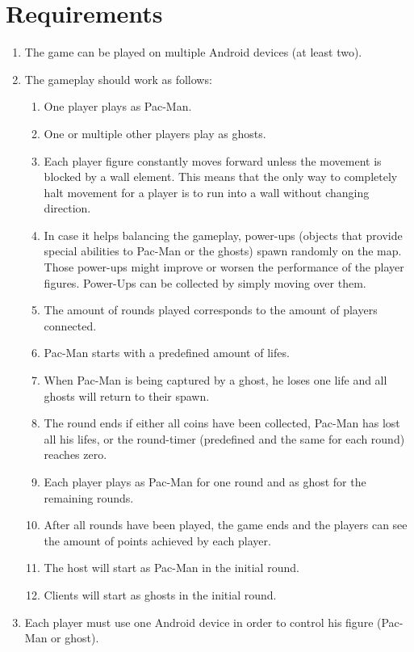 \documentclass{report}
\begin{document}
\section{Requirements}


\begin{enumerate}
	\item The game can be played on multiple Android devices (at least two).
	\item The gameplay should work as follows:
	\begin{enumerate}
		\item One player plays as Pac-Man.
		\item One or multiple other players play as ghosts.
		\item Each player figure constantly moves forward unless the movement is blocked by a wall element. This means that the only way to completely halt movement for a player is to run into a wall without changing direction.
		\item In case it helps balancing the gameplay, power-ups (objects that provide special abilities to Pac-Man or the ghosts) spawn randomly on the map. Those power-ups might improve or worsen the performance of the player figures. Power-Ups can be collected by simply moving over them.
		\item The amount of rounds played corresponds to the amount of players connected.
		\item Pac-Man starts with a predefined amount of lifes.
		\item When Pac-Man is being captured by a ghost, he loses one life and all ghosts will return to their spawn.
		\item The round ends if either all coins have been collected, Pac-Man has lost all his lifes, or the round-timer (predefined and the same for each round) reaches zero.
		\item Each player plays as Pac-Man for one round and as ghost for the remaining rounds.
		\item After all rounds have been played, the game ends and the players can see the amount of points achieved by each player.
		\item The host will start as Pac-Man in the initial round.
		\item Clients will start as ghosts in the initial round.
	\end{enumerate}
	\item Each player must use one Android device in order to control his figure (Pac-Man or ghost).

\end{enumerate}
\end{document}

